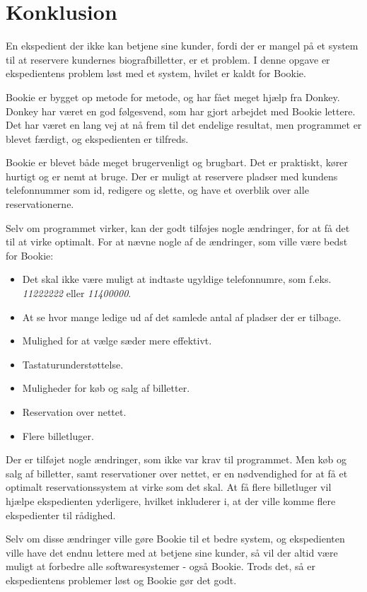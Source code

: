 \chapter{Konklusion}

En ekspedient der ikke kan betjene sine kunder, fordi der er mangel på et system til at reservere kundernes biografbilletter, er et problem. I denne opgave er ekspedientens problem løst med et system, hvilet er kaldt for Bookie.

Bookie er bygget op metode for metode, og har fået meget hjælp fra Donkey. Donkey har været en god følgesvend, som har gjort arbejdet med Bookie lettere. Det har været en lang vej at nå frem til det endelige resultat, men programmet er blevet færdigt, og ekspedienten er tilfreds.

Bookie er blevet både meget brugervenligt og brugbart. Det er praktiskt, kører hurtigt og er nemt at bruge. Der er muligt at reservere pladser med kundens telefonnummer som id, redigere og slette, og have et overblik over alle reservationerne. 

Selv om programmet virker, kan der godt tilføjes nogle ændringer, for at få det til at virke optimalt. For at nævne nogle af de ændringer, som ville være bedst for Bookie:

\begin{itemize}
  \item Det skal ikke være muligt at indtaste ugyldige telefonnumre, som f.eks. \textit{
  11222222} eller \textit{11400000}.
  \item At se hvor mange ledige ud af det samlede antal af pladser der er tilbage.
  \item Mulighed for at vælge sæder mere effektivt.
  
  \item Tastaturunderstøttelse.
  
  \item Muligheder for køb og salg af billetter.
  
  \item Reservation over nettet.
  
  \item Flere billetluger.
  
\end{itemize}
Der er tilføjet nogle ændringer, som ikke var krav til programmet. Men køb og salg af billetter, samt reservationer over nettet, er en nødvendighed for at få et optimalt reservationssystem at virke som det skal. At få flere billetluger vil hjælpe ekspedienten yderligere, hvilket inkluderer i, at der ville komme flere ekspedienter til rådighed.

Selv om disse ændringer ville gøre Bookie til et bedre system, og ekspedienten ville have det endnu lettere med at betjene sine kunder, så vil der altid være muligt at forbedre alle softwaresystemer - også Bookie. 
Trods det, så er ekspedientens problemer løst og Bookie gør det godt.





